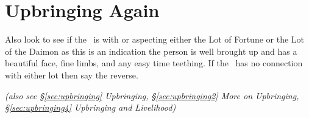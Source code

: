 \section{Upbringing Again}
\label{sec:upbringing3}

Also look to see if the \Moon\, is with or aspecting either the Lot of Fortune or the Lot of the Daimon as this is an indication the person is well brought up and has a beautiful face, fine limbs, and any easy time teething. If the \Moon\, has no connection with either lot then say the reverse.

\textsl{\small(also see \S\ref{sec:upbringing} Upbringing, \S\ref{sec:upbringing2} More on Upbringing, \S\ref{sec:upbringing4} Upbringing and Livelihood)}